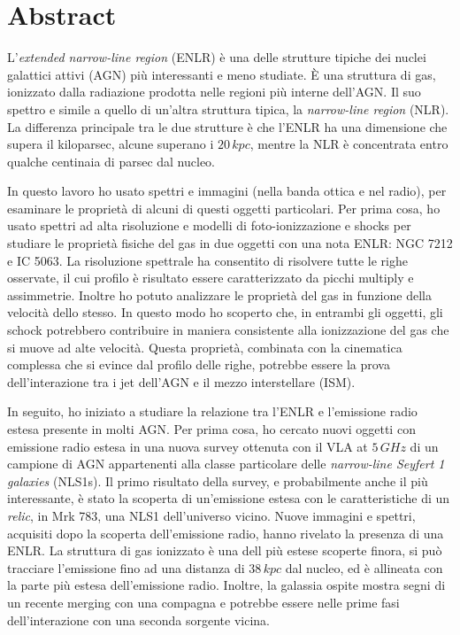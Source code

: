 \documentclass[../main.tex]{subfiles}
\begin{document}
\chapter{Abstract}
\label{sec:abstract}

L'\emph{extended narrow-line region} (ENLR) \`e una delle strutture tipiche dei nuclei galattici attivi (AGN) pi\`u interessanti e meno studiate.
\`E una struttura di gas, ionizzato dalla radiazione prodotta nelle regioni pi\`u interne dell'AGN.
Il suo spettro e simile a quello di un'altra struttura tipica, la \emph{narrow-line region} (NLR).
La differenza principale tra le due strutture \`e che l'ENLR  ha una dimensione che supera il kiloparsec, alcune superano i $20\,\si{kpc}$, mentre la NLR \`e concentrata entro qualche centinaia di parsec dal nucleo.

In questo lavoro ho usato spettri e immagini (nella banda ottica e nel radio), per esaminare le propriet\`a di alcuni di questi oggetti particolari.
Per prima cosa, ho usato spettri ad alta risoluzione e modelli di foto-ionizzazione e shocks per studiare le propriet\`a fisiche del gas in due oggetti con una nota ENLR: NGC 7212 e IC 5063.
La risoluzione spettrale ha consentito di risolvere tutte le righe osservate, il cui profilo \`e risultato essere caratterizzato da picchi multiply e assimmetrie.
Inoltre ho potuto analizzare le propriet\`a del gas in funzione della velocit\`a dello stesso.
In questo modo ho scoperto che, in entrambi gli oggetti, gli schock potrebbero contribuire in maniera consistente alla ionizzazione del gas che si muove ad alte velocit\`a.
Questa propriet\`a, combinata con la cinematica complessa che si evince dal profilo delle righe, potrebbe essere la prova dell'interazione tra i jet dell'AGN e il mezzo interstellare (ISM).

In seguito, ho iniziato a studiare la relazione tra l'ENLR e l'emissione radio estesa presente in molti AGN.
Per prima cosa, ho cercato nuovi oggetti con emissione radio estesa in una nuova survey ottenuta con il VLA at $5\,\si{GHz}$ di un campione di AGN appartenenti alla classe particolare delle \emph{narrow-line Seyfert 1 galaxies} (NLS1s).
Il primo risultato della survey, e probabilmente anche il pi\`u interessante, \`e stato la scoperta di un'emissione estesa con le caratteristiche di un \emph{relic}, in Mrk 783, una NLS1 dell'universo vicino.
Nuove immagini e spettri, acquisiti dopo la scoperta dell'emissione radio, hanno rivelato la presenza di una ENLR.
La struttura di gas ionizzato \`e una dell pi\`u estese scoperte finora, si pu\`o tracciare l'emissione fino ad una distanza di $38\,\si{kpc}$ dal nucleo, ed \`e allineata con la parte pi\`u estesa dell'emissione radio.
Inoltre, la galassia ospite mostra segni di un recente merging con una compagna e potrebbe essere nelle prime fasi dell'interazione con una seconda sorgente vicina.
\end{document}

